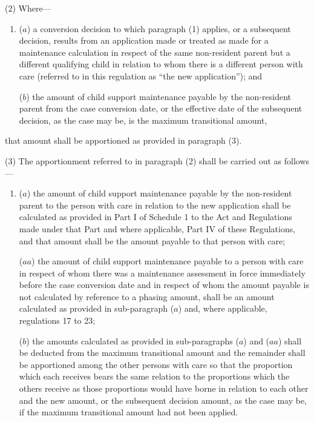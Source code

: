 \documentclass[12pt,a4paper]{article}
\begin{document}
(2) Where—
\begin{enumerate}\item[]
($a$) a conversion decision to which paragraph (1) applies, or a subsequent decision, results from an application made or treated as made for a maintenance calculation in respect of the same non-resident parent but a different qualifying child in relation to whom there is a different person with care (referred to in this regulation as “the new application”); and

($b$) the amount of child support maintenance payable by the non-resident parent from the case conversion date, or the effective date of the subsequent decision, as the case may be, is the maximum transitional amount,
\end{enumerate}
that amount shall be apportioned as provided in paragraph (3).

(3) The apportionment referred to in paragraph (2) shall be carried out as follows—
\begin{enumerate}\item[]
($a$) the amount of child support maintenance payable by the non-resident parent to the person with care in relation to the new application shall be calculated as provided in Part I of Schedule 1 to the Act and Regulations made under that Part and where applicable, Part IV of these Regulations, and that amount shall be the amount payable to that person with care;

($aa$) the amount of child support maintenance payable to a person with care in respect of whom there was a maintenance assessment in force immediately before the case conversion date and in respect of whom the amount payable is not calculated by reference to a phasing amount, shall be an amount calculated as provided in sub-paragraph ($a$)  and, where applicable, regulations 17 to 23;

($b$) 
the amounts calculated as provided in sub-paragraphs ($a$)  and ($aa$)  %
shall be deducted from the maximum transitional amount and the remainder shall be apportioned among the other persons with care so that the proportion which each receives bears the same relation to the proportions which the others receive as those proportions would have borne in relation to each other and the new amount, or the subsequent decision amount, as the case may be, if the maximum transitional amount had not been applied.
\end{enumerate}
\end{document}
